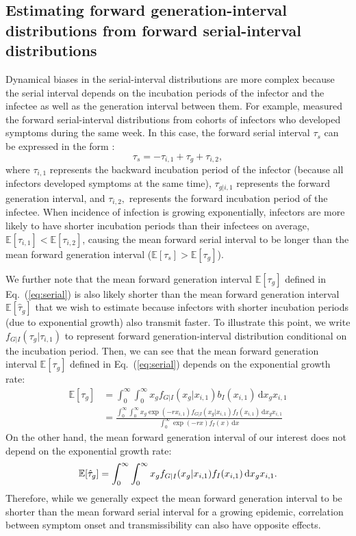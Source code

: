 \documentclass[12pt]{article}
\newcommand{\eref}[1]{Eq.~(\ref{eq:#1})}
\newcommand{\dd}[1]{\ensuremath{\, \mathrm{d}#1}}
\newcommand{\dx}{\dd{x}}
\begin{document}
\subsection{Estimating forward generation-interval distributions from forward serial-interval distributions}

Dynamical biases in the serial-interval distributions are more complex because the serial interval depends on the incubation periods of the infector and the infectee as well as the generation interval between them.
For example, \cite{backer2021omicron} measured the forward serial-interval distributions from cohorts of infectors who developed symptoms during the same week.
In this case, the forward serial interval $\tau_s$ can be expressed in the form \citep{park2021forward}:
\begin{equation}
\tau_s =  - \tau_{i, 1} + \tau_{g} + \tau_{i, 2},
\label{eq:serial}
\end{equation}
where $\tau_{i, 1}$ represents the backward incubation period of the infector (because all infectors developed symptoms at the same time), $\tau_{g|i,1}$ represents the forward generation interval, and $\tau_{i, 2},$ represents the forward incubation period of the infectee.
When incidence of infection is growing exponentially, infectors are more likely to have shorter incubation periods than their infectees on average, $\mathbb E[\tau_{i, 1}] < \mathbb E[\tau_{i, 2}]$, causing the mean forward serial interval to be longer than the mean forward generation interval ($\mathbb E[\tau_s] > \mathbb E[\tau_{g}]$).

We further note that the mean forward generation interval $\mathbb E[\tau_{g}]$ defined in \eref{serial} is also likely shorter than the mean forward generation interval $\mathbb E[\hat{\tau}_{g}]$ that we wish to estimate because infectors with shorter incubation periods (due to exponential growth) also transmit faster.
To illustrate this point, we write $f_{G|I}(\tau_g|\tau_{i,1})$ to represent forward generation-interval distribution conditional on the incubation period.
Then, we can see that the mean forward generation interval $\mathbb E[\tau_{g}]$ defined in \eref{serial} depends on the exponential growth rate:
\begin{align}
\mathbb E[\tau_{g}] &= \int_0^\infty \int_0^\infty x_g f_{G|I}(x_g|x_{i,1}) b_I(x_{i,1}) \dd x_g x_{i, 1}\\
&= \frac{\int_0^\infty \int_0^\infty x_g \exp(-rx_{i,1})  f_{G|I}(x_g|x_{i,1}) f_I(x_{i,1}) \dd x_g x_{i, 1}}{\int_0^\infty  \exp(-r x) f_I(x) \dx}
\end{align}
On the other hand, the mean forward generation interval of our interest does not depend on the exponential growth rate:
\begin{equation}
\mathbb E[\hat{\tau}_{g}] = \int_0^\infty \int_0^\infty x_g f_{G|I}(x_g|x_{i,1}) f_I(x_{i,1}) \dd x_g x_{i, 1}.\\
\label{eq:meangen}
\end{equation}
Therefore, while we generally expect the mean forward generation interval to be shorter than the mean forward serial interval for a growing epidemic, correlation between symptom onset and transmissibility can also have opposite effects.
\end{document}
